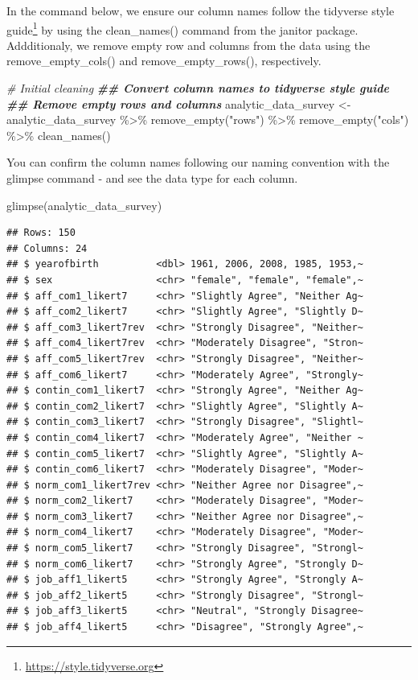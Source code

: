 \documentclass[
]{krantz}
\makeatletter
\newenvironment{Shaded}{\begin{snugshade}}{\end{snugshade}}
\newcommand{\CommentTok}[1]{\textcolor[rgb]{0.37,0.37,0.37}{\textit{#1}}}
\newcommand{\DocumentationTok}[1]{\textcolor[rgb]{0.37,0.37,0.37}{\textbf{\textit{#1}}}}
\newcommand{\FunctionTok}[1]{\textcolor[rgb]{0,0,0}{#1}}
\newcommand{\NormalTok}[1]{#1}
\newcommand{\OtherTok}[1]{\textcolor[rgb]{0.37,0.37,0.37}{#1}}
\newcommand{\SpecialCharTok}[1]{\textcolor[rgb]{0,0,0}{#1}}
\newcommand{\StringTok}[1]{\textcolor[rgb]{0.5,0.5,0.5}{#1}}
\renewcommand{\href}[2]{#2\footnote{\url{#1}}}
\newenvironment{kframe}{%
\medskip{}
\setlength{\fboxsep}{.8em}
 \def\at@end@of@kframe{}%
 \ifinner\ifhmode%
  \def\at@end@of@kframe{\end{minipage}}%
  \begin{minipage}{\columnwidth}%
 \fi\fi%
 \def\FrameCommand##1{\hskip\@totalleftmargin \hskip-\fboxsep
 \colorbox{shadecolor}{##1}\hskip-\fboxsep
     \hskip-\linewidth \hskip-\@totalleftmargin \hskip\columnwidth}%
 \MakeFramed {\advance\hsize-\width
   \@totalleftmargin\z@ \linewidth\hsize
   \@setminipage}}%
 {\par\unskip\endMakeFramed%
 \at@end@of@kframe}
\renewenvironment{Shaded}{\begin{kframe}}{\end{kframe}}
\makeatother
\begin{document}
In the command below, we ensure our column names follow the tidyverse \href{https://style.tidyverse.org}{style guide} by using the clean\_names() command from the janitor package. Addditionaly, we remove empty row and columns from the data using the remove\_empty\_cols() and remove\_empty\_rows(), respectively.

\begin{Shaded}
\begin{Highlighting}[]
\CommentTok{\# Initial cleaning}
\DocumentationTok{\#\# Convert column names to tidyverse style guide}
\DocumentationTok{\#\# Remove empty rows and columns}
\NormalTok{analytic\_data\_survey }\OtherTok{\textless{}{-}}\NormalTok{ analytic\_data\_survey }\SpecialCharTok{\%\textgreater{}\%}
  \FunctionTok{remove\_empty}\NormalTok{(}\StringTok{"rows"}\NormalTok{) }\SpecialCharTok{\%\textgreater{}\%}
  \FunctionTok{remove\_empty}\NormalTok{(}\StringTok{"cols"}\NormalTok{) }\SpecialCharTok{\%\textgreater{}\%}
  \FunctionTok{clean\_names}\NormalTok{()}
\end{Highlighting}
\end{Shaded}

You can confirm the column names following our naming convention with the glimpse command - and see the data type for each column.

\begin{Shaded}
\begin{Highlighting}[]
\FunctionTok{glimpse}\NormalTok{(analytic\_data\_survey)}
\end{Highlighting}
\end{Shaded}

\begin{verbatim}
## Rows: 150
## Columns: 24
## $ yearofbirth          <dbl> 1961, 2006, 2008, 1985, 1953,~
## $ sex                  <chr> "female", "female", "female",~
## $ aff_com1_likert7     <chr> "Slightly Agree", "Neither Ag~
## $ aff_com2_likert7     <chr> "Slightly Agree", "Slightly D~
## $ aff_com3_likert7rev  <chr> "Strongly Disagree", "Neither~
## $ aff_com4_likert7rev  <chr> "Moderately Disagree", "Stron~
## $ aff_com5_likert7rev  <chr> "Strongly Disagree", "Neither~
## $ aff_com6_likert7     <chr> "Moderately Agree", "Strongly~
## $ contin_com1_likert7  <chr> "Strongly Agree", "Neither Ag~
## $ contin_com2_likert7  <chr> "Slightly Agree", "Slightly A~
## $ contin_com3_likert7  <chr> "Strongly Disagree", "Slightl~
## $ contin_com4_likert7  <chr> "Moderately Agree", "Neither ~
## $ contin_com5_likert7  <chr> "Slightly Agree", "Slightly A~
## $ contin_com6_likert7  <chr> "Moderately Disagree", "Moder~
## $ norm_com1_likert7rev <chr> "Neither Agree nor Disagree",~
## $ norm_com2_likert7    <chr> "Moderately Disagree", "Moder~
## $ norm_com3_likert7    <chr> "Neither Agree nor Disagree",~
## $ norm_com4_likert7    <chr> "Moderately Disagree", "Moder~
## $ norm_com5_likert7    <chr> "Strongly Disagree", "Strongl~
## $ norm_com6_likert7    <chr> "Strongly Agree", "Strongly D~
## $ job_aff1_likert5     <chr> "Strongly Agree", "Strongly A~
## $ job_aff2_likert5     <chr> "Strongly Disagree", "Strongl~
## $ job_aff3_likert5     <chr> "Neutral", "Strongly Disagree~
## $ job_aff4_likert5     <chr> "Disagree", "Strongly Agree",~
\end{verbatim}
\end{document}
